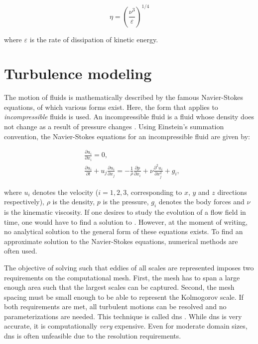 \begin{equation}
    \eta = \left( \frac{\nu^3}{\varepsilon} \right)^{1/4}
    \label{eq:kolmogorov-length}
\end{equation}

where $\varepsilon$ is the rate of dissipation of kinetic energy.

\section{Turbulence modeling}
The motion of fluids is mathematically described by the famous Navier-Stokes equations, of which various forms exist. Here, the form that applies to \emph{incompressible} fluids is used. An incompressible fluid is a fluid whose density does not change as a result of pressure changes \citep{popeTurbulentFlows2000}. Using Einstein's summation convention, the Navier-Stokes equations for an incompressible fluid are given by:

\begin{align}
    &\frac{\partial u_i}{\partial x_i} = 0, \label{eq:ns_mass_conservation}\\
    &\frac{\partial u_i}{\partial t} + u_j \frac{\partial u_i}{\partial x_j} = - \frac{1}{\rho} \frac{\partial p}{\partial x_i} + \nu \frac{\partial^2 u_i}{\partial x_j^2}+ g_i,
    \label{eq:ns_momentum}
\end{align}

where $u_i$ denotes the velocity ($i=1,2,3$, corresponding to $x$, $y$ and $z$ directions respectively), $\rho$ is the density, $p$ is the pressure, $g_i$ denotes the body forces and $\nu$ is the kinematic viscosity. If one desires to study the evolution of a flow field in time, one would have to find a solution to . However, at the moment of writing, no analytical solution to the general form of these equations exists. To find an approximate solution to the Navier-Stokes equations, numerical methods are often used. 

The objective of solving  such that eddies of all scales are represented imposes two requirements on the computational mesh. First, the mesh has to span a large enough area such that the largest scales can be captured. Second, the mesh spacing must be small enough to be able to represent the Kolmogorov scale. If both requirements are met, all turbulent motions can be resolved and no parameterizations are needed. This technique is called \acrfull{dns} \citep{popeTurbulentFlows2000}. While \acrshort{dns} is very accurate, it is computationally \emph{very} expensive. Even for moderate domain sizes, \acrshort{dns} is often unfeasible due to the resolution requirements.

